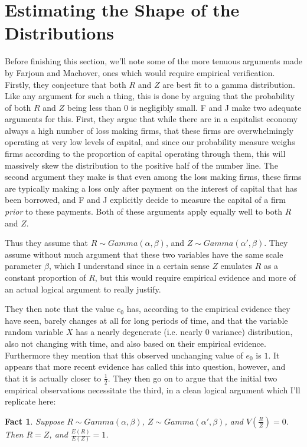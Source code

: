 \documentclass{article}
\theoremstyle{definition}
\theoremstyle{plain}
\theoremstyle{theorem}
\newtheorem{fact}{Fact}[section]
\begin{document}
\section{Estimating the Shape of the Distributions}
Before finishing this section, we'll note some of the more tenuous arguments made by Farjoun and Machover, ones which would require empirical verification. Firstly, they conjecture that both $R$ and $Z$ are best fit to a gamma distribution. Like any argument for such a thing, this is done by arguing that the probability of both $R$ and $Z$ being less than $0$ is negligibly small. F and J make two adequate arguments for this. First, they argue that while there are in a capitalist economy always a high number of loss making firms, that these firms are overwhelmingly operating at very low levels of capital, and since our probability measure weighs firms according to the proportion of capital operating through them, this will massively skew the distribution to the positive half of the number line. The second argument they make is that even among the loss making firms, these firms are typically making a loss only after payment on the interest of capital that has been borrowed, and F and J explicitly decide to measure the capital of a firm \textit{prior} to these payments. Both of these arguments apply equally well to both $R$ and $Z$. \par 
Thus they assume that $R \sim Gamma(\alpha,\beta)$, and $Z \sim Gamma(\alpha',\beta)$. They assume without much argument that these two variables have the same scale parameter $\beta$, which I understand since in a certain sense $Z$ emulates $R$ as a constant proportion of $R$, but this would require empirical evidence and more of an actual logical argument to really justify. \par 
They then note that the value $e_0$ has, according to the empirical evidence they have seen, barely changes at all for long periods of time, and that the variable random variable $X$ has a nearly degenerate (i.e. nearly $0$ variance) distribution, also not changing with time, and also based on their empirical evidence. Furthermore they mention that this observed unchanging value of $e_0$ is $1$. It appears that more recent evidence has called this into question, however, and that it is actually closer to $\frac{1}{2}$. They then go on to argue that the initial two empirical observations necessitate the third, in a clean logical argument which I'll replicate here:
\begin{fact}
	Suppose $R \sim Gamma(\alpha,\beta)$, $Z \sim Gamma(\alpha',\beta)$, and $V\left( \frac{R}{Z} \right) = 0$. Then $R = Z$, and $\frac{E(R)}{E(Z)} = 1$.  
\end{fact} 
\end{document}
